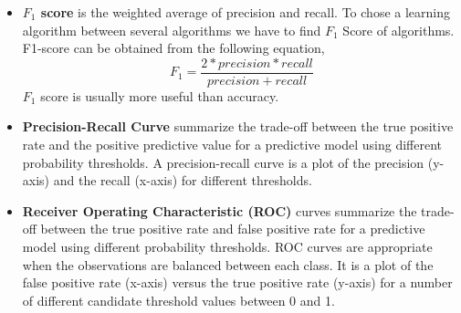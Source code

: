 \begin{itemize}
\vspace{0.3cm}
\item{\textbf{$F_1$ score}} is the weighted average of precision and recall. To chose a learning algorithm between several algorithms we have to find $F_1$ Score of algorithms. F1-score can be obtained from the following equation,
 \begin{equation}
     F_1 = \frac{2*precision*recall}{precision+recall}
 \end{equation}
$F_1$ score is usually more useful than accuracy.

\vspace{0.3cm}
\item{\textbf{Precision-Recall Curve}} summarize the trade-off between the true positive rate and the positive predictive value for a predictive model using different probability thresholds. A precision-recall curve is a plot of the precision (y-axis) and the recall (x-axis) for different thresholds.

\vspace{0.3cm}
\item{\textbf{Receiver Operating Characteristic (ROC)}}
 curves summarize the trade-off between the true positive rate and false positive rate for a predictive model using different probability thresholds. ROC curves are appropriate when the observations are balanced between each class. 
It is a plot of the false positive rate (x-axis) versus the true positive rate (y-axis) for a number of different candidate threshold values between 0 and 1.
\end{itemize}